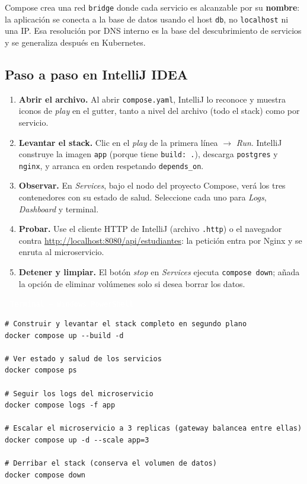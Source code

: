 \documentclass[11pt,a4paper]{article}
\newcommand{\archivo}[1]{\par\vspace{5pt}\noindent\colorbox{uteqBlue}{\textcolor{white}{\small\,\faFileIco\ \texttt{#1}\,}}\par\nopagebreak\vspace{1pt}}
\newcommand{\faFileIco}{\raisebox{-0.1ex}{\scriptsize$\square$}}
\begin{document}
\begin{keybox}
Compose crea una red \texttt{bridge} donde cada servicio es alcanzable por su \textbf{nombre}: la aplicaci\'on se conecta a la base de datos usando el host \texttt{db}, no \texttt{localhost} ni una IP. Esa resoluci\'on por DNS interno es la base del descubrimiento de servicios y se generaliza despu\'es en Kubernetes.
\end{keybox}

\subsection{Paso a paso en IntelliJ IDEA}

\begin{enumerate}
\item \textbf{Abrir el archivo.} Al abrir \texttt{compose.yaml}, IntelliJ lo reconoce y muestra iconos de \emph{play} en el gutter, tanto a nivel del archivo (todo el stack) como por servicio.
\item \textbf{Levantar el stack.} Clic en el \emph{play} de la primera l\'inea $\rightarrow$ \emph{Run}. IntelliJ construye la imagen \texttt{app} (porque tiene \texttt{build: .}), descarga \texttt{postgres} y \texttt{nginx}, y arranca en orden respetando \texttt{depends\_on}.
\item \textbf{Observar.} En \emph{Services}, bajo el nodo del proyecto Compose, ver\'a los tres contenedores con su estado de salud. Seleccione cada uno para \emph{Logs}, \emph{Dashboard} y terminal.
\item \textbf{Probar.} Use el cliente HTTP de IntelliJ (archivo \texttt{.http}) o el navegador contra \url{http://localhost:8080/api/estudiantes}: la petici\'on entra por Nginx y se enruta al microservicio.
\item \textbf{Detener y limpiar.} El bot\'on \emph{stop} en \emph{Services} ejecuta \texttt{compose down}; a\~nada la opci\'on de eliminar vol\'umenes solo si desea borrar los datos.
\end{enumerate}

\archivo{Terminal --- Windows PowerShell}
\begin{lstlisting}[numbers=none]
# Construir y levantar el stack completo en segundo plano
docker compose up --build -d

# Ver estado y salud de los servicios
docker compose ps

# Seguir los logs del microservicio
docker compose logs -f app

# Escalar el microservicio a 3 replicas (gateway balancea entre ellas)
docker compose up -d --scale app=3

# Derribar el stack (conserva el volumen de datos)
docker compose down
\end{lstlisting}
\end{document}
